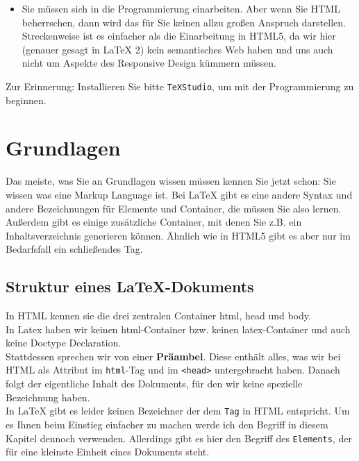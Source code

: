 \begin{itemize}
	\item Sie müssen sich in die Programmierung einarbeiten. Aber wenn Sie HTML beherrschen, dann wird das für Sie keinen allzu großen Anspruch darstellen. Streckenweise ist es einfacher als die Einarbeitung in HTML5, da wir hier (genauer gesagt in LaTeX 2) kein semantisches Web haben und uns auch nicht um Aspekte des Responsive Design kümmern müssen.
\end{itemize}

Zur Erinnerung: Installieren Sie bitte \verb|TeXStudio|, um mit der Programmierung zu beginnen.

\section{Grundlagen}

Das meiste, was Sie an Grundlagen wissen müssen kennen Sie jetzt schon: Sie wissen was eine Markup Language ist. Bei LaTeX gibt es eine andere Syntax und andere Bezeichnungen für Elemente und Container, die müssen Sie also lernen. Außerdem gibt es einige zusätzliche Container, mit denen Sie z.B. ein Inhaltsverzeichnis generieren können. Ähnlich wie in HTML5 gibt es aber nur im Bedarfsfall ein schließendes Tag.\\

\subsection{Struktur eines LaTeX-Dokuments}

In HTML kennen sie die drei zentralen Container html, head und body.\\

In Latex haben wir keinen html-Container bzw. keinen latex-Container und auch keine Doctype Declaration.\\

Stattdessen sprechen wir von einer \textbf{Präambel}. Diese enthält alles, was wir bei HTML als Attribut im \verb|html|-Tag und im \verb|<head>| untergebracht haben. Danach folgt der eigentliche Inhalt des Dokuments, für den wir keine spezielle Bezeichnung haben.\\

In LaTeX gibt es leider keinen Bezeichner der dem \verb|Tag| in HTML entspricht. Um es Ihnen beim Einstieg einfacher zu machen werde ich den Begriff in diesem Kapitel dennoch verwenden. Allerdings gibt es hier den Begriff des \verb|Elements|, der für eine kleinste Einheit eines Dokuments steht.

